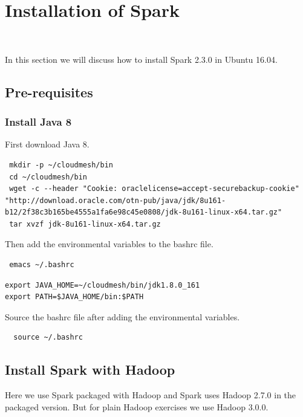 \section{Installation of Spark}
\label{c:spark-local-installation}
\FILENAME\

In this section we will discuss how to install Spark 2.3.0 in Ubuntu 16.04.

\subsection{Pre-requisites}

\subsubsection{Install Java 8}

First download Java 8.

\begin{lstlisting}
 mkdir -p ~/cloudmesh/bin
 cd ~/cloudmesh/bin
 wget -c --header "Cookie: oraclelicense=accept-securebackup-cookie" "http://download.oracle.com/otn-pub/java/jdk/8u161-b12/2f38c3b165be4555a1fa6e98c45e0808/jdk-8u161-linux-x64.tar.gz"
 tar xvzf jdk-8u161-linux-x64.tar.gz
\end{lstlisting}

Then add the environmental variables to the bashrc file. 

\begin{lstlisting}
 emacs ~/.bashrc
\end{lstlisting}

\begin{lstlisting}
export JAVA_HOME=~/cloudmesh/bin/jdk1.8.0_161
export PATH=$JAVA_HOME/bin:$PATH
\end{lstlisting}

Source the bashrc file after adding the environmental variables.

\begin{lstlisting}
  source ~/.bashrc
\end{lstlisting}

\subsection{Install Spark with Hadoop}\label{s:s:install-spark-with-hadoop}

\begin{NOTE}
  Here we use Spark packaged with Hadoop and Spark uses Hadoop 2.7.0
  in the packaged version. But for plain Hadoop exercises we use
  Hadoop 3.0.0.
\end{NOTE}

